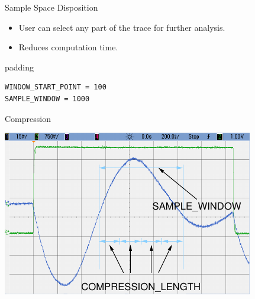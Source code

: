\documentclass[xcolor=pdftex,dvipsnames,table,final]{beamer}
\begin{document}
\begin{frame}[fragile]{}
\begin{columns}[t]
\begin{column}{.31\linewidth}
\begin{block}{Sample Space Disposition}
\begin{minipage}[t]{0.49\linewidth}
        \end{minipage}%
        \begin{minipage}[t]{0.49\linewidth}%
          \vspace{-6.5cm}%
          \begin{itemize}
            \item User can select any part of the trace for further analysis.
            \item Reduces computation time.
          \end{itemize} 
          \begin{center}
            \begin{beamercolorbox}[rounded=true]{padding}%
               \footnotesize%
              \begin{lstlisting}
WINDOW_START_POINT = 100
SAMPLE_WINDOW = 1000
              \end{lstlisting}
            \end{beamercolorbox}
          \end{center}
        \end{minipage}
       \end{block}
       \begin{block}{Compression}
        \begin{minipage}[t]{0.49\linewidth}
		\includegraphics[width=0.9\linewidth]{../figures/oscilloscope-compression-window}
        \end{minipage}%
        \begin{minipage}[t]{0.49\linewidth}%
          \vspace{-6.5cm}%
         \begin{itemize}

\end{itemize}
\end{minipage}
\end{block}
\end{column}
\end{columns}
\end{frame}
\end{document}
